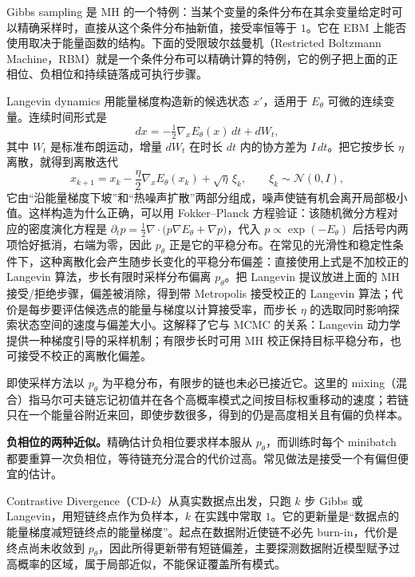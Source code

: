Gibbs sampling 是 MH 的一个特例：当某个变量的条件分布在其余变量给定时可以精确采样时，直接从这个条件分布抽新值，接受率恒等于 \(1\)。它在 EBM 上能否使用取决于能量函数的结构。下面的受限玻尔兹曼机（Restricted Boltzmann Machine，RBM）就是一个条件分布可以精确计算的特例，它的例子把上面的正相位、负相位和持续链落成可执行步骤。

Langevin dynamics 用能量梯度构造新的候选状态 \(x'\)，适用于 \(E_\theta\) 可微的连续变量。连续时间形式是
\begin{equation}
 dx=-\tfrac12\nabla_x E_\theta(x)\,dt+dW_t,
\end{equation}
其中 \(W_t\) 是标准布朗运动，增量 \(dW_t\) 在时长 \(dt\) 内的协方差为 \(I\,dt\)。把它按步长 \(\eta\) 离散，就得到离散迭代
\begin{equation}
 x_{k+1}=x_k-\frac{\eta}{2}\nabla_x E_\theta(x_k)+\sqrt{\eta}\,\xi_k,\qquad \xi_k\sim\mathcal N(0,I),
 \label{eq:langevin-step}
\end{equation}
它由“沿能量梯度下坡”和“热噪声扩散”两部分组成，噪声使链有机会离开局部极小值。这样构造为什么正确，可以用 Fokker--Planck 方程验证：该随机微分方程对应的密度演化方程是
\(\partial_t p=\tfrac12\nabla\cdot\bigl(p\nabla E_\theta+\nabla p\bigr)\)，代入 \(p\propto\exp(-E_\theta)\) 后括号内两项恰好抵消，右端为零，因此 \(p_\theta\) 正是它的平稳分布。在常见的光滑性和稳定性条件下，这种离散化会产生随步长变化的平稳分布偏差：直接使用上式是不加校正的 Langevin 算法，步长有限时采样分布偏离 \(p_\theta\)。把 Langevin 提议放进上面的 MH 接受/拒绝步骤，偏差被消除，得到带 Metropolis 接受校正的 Langevin 算法；代价是每步要评估候选点的能量与梯度以计算接受率，而步长 \(\eta\) 的选取同时影响探索状态空间的速度与偏差大小。这解释了它与 MCMC 的关系：Langevin 动力学提供一种梯度引导的采样机制；有限步长时可用 MH 校正保持目标平稳分布，也可接受不校正的离散化偏差。

即使采样方法以 \(p_\theta\) 为平稳分布，有限步的链也未必已接近它。这里的 mixing（混合）指马尔可夫链忘记初值并在各个高概率模式之间按目标权重移动的速度；若链只在一个能量谷附近来回，即使步数很多，得到的仍是高度相关且有偏的负样本。

\textbf{负相位的两种近似。}精确估计负相位要求样本服从 \(p_\theta\)，而训练时每个 minibatch 都要重算一次负相位，等待链充分混合的代价过高。常见做法是接受一个有偏但便宜的估计。

Contrastive Divergence（CD-\(k\)）从真实数据点出发，只跑 \(k\) 步 Gibbs 或 Langevin，用短链终点作为负样本，\(k\) 在实践中常取 \(1\)。它的更新量是“数据点的能量梯度减短链终点的能量梯度”。起点在数据附近使链不必先 burn-in，代价是终点尚未收敛到 \(p_\theta\)，因此所得更新带有短链偏差，主要探测数据附近模型赋予过高概率的区域，属于局部近似，不能保证覆盖所有模式。

